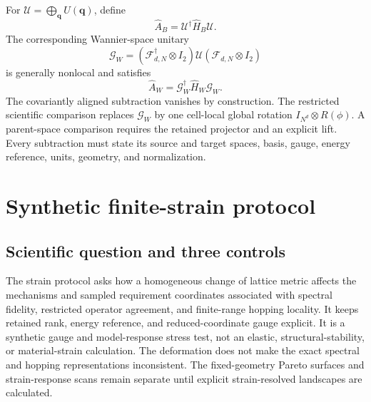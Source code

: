 \documentclass[11pt]{article}
\begin{document}
For $\mathcal U=\bigoplus_{\mathbf q}U(\mathbf q)$, define
\begin{equation}
 \widehat A_B=\mathcal U^\dagger\widehat H_B\mathcal U.
\end{equation}
The corresponding Wannier-space unitary
\begin{equation}
 \mathcal G_W=(\mathcal F_{d,N}^\dagger\otimes I_2)
 \mathcal U(\mathcal F_{d,N}\otimes I_2)
\end{equation}
is generally nonlocal and satisfies
\begin{equation}
 \widehat A_W=\mathcal G_W^\dagger\widehat H_W\mathcal G_W.
 \label{eq:covariant}
\end{equation}
The covariantly aligned subtraction vanishes by construction. The restricted scientific
comparison replaces $\mathcal G_W$ by one cell-local global rotation
$I_{N^d}\otimes R(\phi)$. A parent-space comparison requires the retained projector and
an explicit lift. Every subtraction must state its source and target spaces, basis,
gauge, energy reference, units, geometry, and normalization.

\section{Synthetic finite-strain protocol}
\label{sec:strain-protocol}

\subsection{Scientific question and three controls}

The strain protocol asks how a homogeneous change of lattice metric affects the
mechanisms and sampled requirement coordinates associated with spectral fidelity,
restricted operator agreement, and finite-range hopping locality. It keeps retained
rank, energy reference, and reduced-coordinate gauge explicit. It is a synthetic gauge
and model-response stress test, not an elastic, structural-stability, or material-strain
calculation. The deformation does not make the exact spectral and hopping
representations inconsistent. The fixed-geometry Pareto surfaces and strain-response
scans remain separate until explicit strain-resolved landscapes are calculated.
\end{document}
